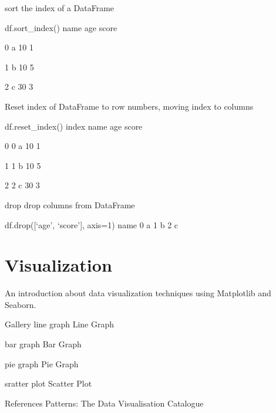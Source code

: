 sort the index of a DataFrame

df.sort_index()
name age score

0 a 10 1

1 b 10 5

2 c 30 3

Reset index of DataFrame to row numbers, moving index to columns

df.reset_index()
index name age score

0 0 a 10 1

1 1 b 10 5

2 2 c 30 3

drop
drop columns from DataFrame

df.drop([‘age’, ‘score’], axis=1)
name
0	a
1	b
2	c

\section{Visualization}

An introduction about data visualization techniques using Matplotlib and Seaborn.

Gallery
 line graph
Line Graph

 bar graph
Bar Graph

 pie graph
Pie Graph

 sratter plot
Scatter Plot

References
Patterns: The Data Visualisation Catalogue



